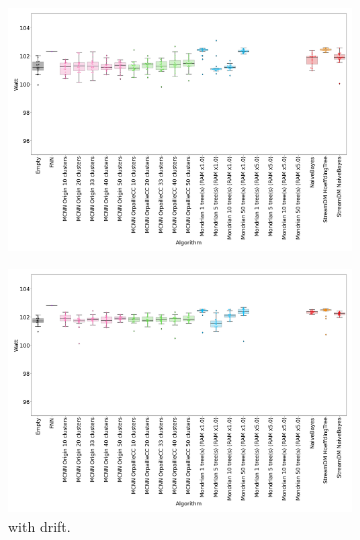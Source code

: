 \begin{figure}
	\begin{subfigure}[t]{.49\linewidth}
		\includegraphics[width=\linewidth]{figures/results/banos_3_watt.png}
		\caption{\banosdataset}
		\label{fig:power-banos}
	\end{subfigure}
	\hfill
	\begin{subfigure}[t]{.49\linewidth}
		\includegraphics[width=\linewidth]{figures/results/drift_6_watt.png}
		\caption{\banosdataset with drift.}
		\label{fig:power-drift}
	\end{subfigure}\\
	\begin{subfigure}[t]{.49\linewidth}

\end{subfigure}
\end{figure}
